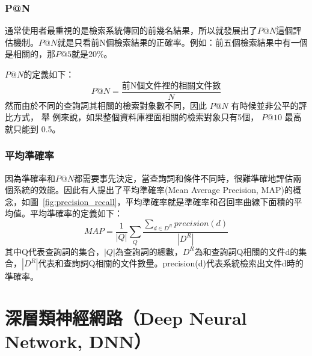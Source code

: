 \subsubsection{P@N}

通常使用者最重視的是檢索系統傳回的前幾名結果，所以就發展出了$P@N$這個評估機制。$P@N$就是只看前N個檢索結果的正確率。例如：前五個檢索結果中有一個是相關的，那$P@5$就是20\%。

$P@N$的定義如下：
\[
P@N=\frac{\text{前N個文件裡的相關文件數}}{N}
\]
 然而由於不同的查詢詞其相關的檢索對象數不同，因此 $P@N$ 有時候並非公平的評比方式， 舉
 例來說，如果整個資料庫裡面相關的檢索對象只有5個， $P@10$ 最高就只能到
 0.5。
\subsubsection{平均準確率~\cite{garofolo2000trec}}

因為準確率和$P@N$都需要事先決定，當查詢詞和條件不同時，很難準確地評估兩個系統的效能。因此有人提出了平均準確率(Mean Average Precision, MAP)的概念，如圖~\ref{fig:precision_recall}，平均準確率就是準確率和召回率曲線下面積的平均值。平均準確率的定義如下：
\begin{equation}
MAP = \frac{1}{|Q|} \sum_Q \frac{\sum_{d \in D^R}precision(d)}{|D^R|}
\end{equation}
其中Q代表查詢詞的集合，$|Q|$為查詢詞的總數，$D^R$為和查詢詞Q相關的文件d的集合，$|D^R|$代表和查詢詞Q相關的文件數量。precision(d)代表系統檢索出文件d時的準確率。




\section{深層類神經網路（Deep Neural Network, DNN）}
\label{DNN}
